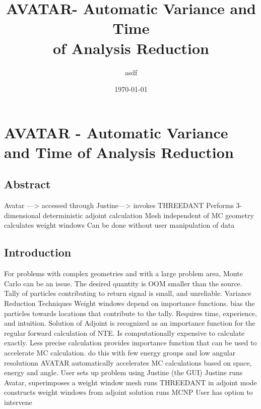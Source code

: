 \documentclass{report}
\begin{document}
\title{AVATAR- Automatic Variance and Time \\
         of Analysis Reduction}
\author{asdf}
\date{\today}
\setcounter{secnumdepth}{0}
\section{AVATAR - Automatic Variance and Time of Analysis Reduction}
\subsection{Abstract}
\begin{outline}
  \1 Avatar —> accessed through Justine—> invokes THREEDANT
  \1 Performs 3-dimensional deterministic adjoint calculation 
  \1 Mesh independent of MC geometry
  \1 calculates weight windows
  \1 Can be done without user manipulation of data
\end{outline}
\subsection{Introduction}
\begin{outline}
  \1 For problems with complex geometries and with a large problem area, Monte Carlo can be an issue. The desired quantity is OOM smaller than the source. Tally of particles contributing to return signal is small, and unreliable. 
  \1 Variance Reduction Techniques
    \2 Weight windows
      \3 depend on importance functions. 
      \3 bias the particles towards locations that contribute to the tally.
      \3 Requires time, experience, and intuition. 
    \2 Solution of Adjoint
      \3 is recognized as an importance function for the regular forward calculation of NTE. 
        \4 Is computationally expensive to calculate exactly. 
      \3 Less  precise calculation provides importance function that can be used to accelerate MC calculation. 
        \4 do this with few energy groups and low angular resolutionn
  \1 AVATAR
    \2 automatically accelerates MC calculations based on space, energy and angle. 
    \2  User sets up problem using Justine (the GUI)
    \2 Justine runs Avatar, 
      \3 superimposes a weight window mesh 
      \3 runs THREEDANT in adjoint mode
      \3 constructs weight windows from adjoint solution
      \3 runs MCNP
    \2 User has option to intervene
\end{outline}
\end{document}
